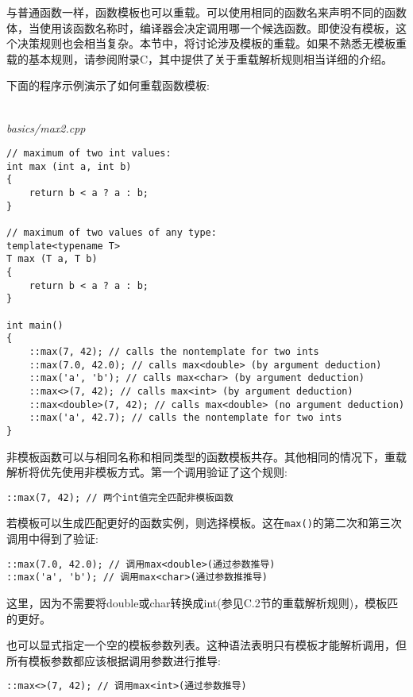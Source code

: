 与普通函数一样，函数模板也可以重载。可以使用相同的函数名来声明不同的函数体，当使用该函数名称时，编译器会决定调用哪一个候选函数。即使没有模板，这个决策规则也会相当复杂。本节中，将讨论涉及模板的重载。如果不熟悉无模板重载的基本规则，请参阅附录C，其中提供了关于重载解析规则相当详细的介绍。

下面的程序示例演示了如何重载函数模板:

\hspace*{\fill} \\ %
\noindent
\textit{basics/max2.cpp}
\begin{lstlisting}[style=styleCXX]
// maximum of two int values:
int max (int a, int b)
{
	return b < a ? a : b;
}

// maximum of two values of any type:
template<typename T>
T max (T a, T b)
{
	return b < a ? a : b;
}

int main()
{
	::max(7, 42); // calls the nontemplate for two ints
	::max(7.0, 42.0); // calls max<double> (by argument deduction)
	::max('a', 'b'); // calls max<char> (by argument deduction)
	::max<>(7, 42); // calls max<int> (by argument deduction)
	::max<double>(7, 42); // calls max<double> (no argument deduction)
	::max('a', 42.7); // calls the nontemplate for two ints
}
\end{lstlisting}

非模板函数可以与相同名称和相同类型的函数模板共存。其他相同的情况下，重载解析将优先使用非模板方式。第一个调用验证了这个规则:

\begin{lstlisting}[style=styleCXX]
::max(7, 42); // 两个int值完全匹配非模板函数
\end{lstlisting}

若模板可以生成匹配更好的函数实例，则选择模板。这在\texttt{max()}的第二次和第三次调用中得到了验证:

\begin{lstlisting}[style=styleCXX]
::max(7.0, 42.0); // 调用max<double>(通过参数推导)
::max('a', 'b'); // 调用max<char>(通过参数推推导)
\end{lstlisting}

这里，因为不需要将double或char转换成int(参见C.2节的重载解析规则)，模板匹的更好。

也可以显式指定一个空的模板参数列表。这种语法表明只有模板才能解析调用，但所有模板参数都应该根据调用参数进行推导:

\begin{lstlisting}[style=styleCXX]
::max<>(7, 42); // 调用max<int>(通过参数推导)
\end{lstlisting}

